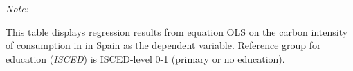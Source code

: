 \begin{table}[htbp!]
\begin{adjustbox}{width = 1\textwidth, max height = 0.95\textheight, center}
\begin{threeparttable}[b]
         \begin{tablenotes}\item \medskip \textit{Note:}
            \item This table displays regression results from equation OLS on the carbon intensity of consumption in  in Spain as the dependent variable. Reference group for education (\textit{ISCED}) is ISCED-level 0-1 (primary or no education).
         \end{tablenotes}
      \end{threeparttable}
   \end{adjustbox}
\end{table}


